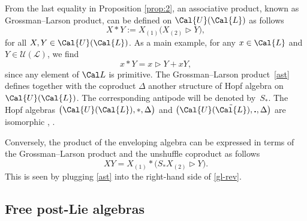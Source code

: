 \documentclass[10pt,a4paper]{amsart}
\numberwithin{equation}{section}
\begin{document}
From the last equality in Proposition \ref{prop:2}, an associative product, known as Grossman--Larson product, can be defined on $\Cal{U}(\Cal{L})$ as follows
\begin{equation}\label{ast}
X \ast Y := X_{(1)}\big(X_{(2)} \rhd Y\big),
\end{equation}
for all $X, Y \in \Cal{U}(\Cal{L})$. As a main example, for any $x\in \Cal{L}$ and $Y\in\mathcal U(\mathcal L)$, we find
\begin{equation}\label{GL-simple}
x \ast Y = x \rhd Y + xY,
\end{equation}
since any element of $\Cal L$ is primitive. The Grossman--Larson product~\eqref{ast} defines together with the coproduct $\Delta$ another structure of Hopf algebra on $\Cal{U}(\Cal{L})$. The corresponding antipode will be denoted by~$S_*$. The Hopf algebras $\big(\Cal{U}(\Cal{L}), \ast, \Delta \big)$ and $\big(\Cal{U}(\tilde{\Cal{L}}), \textbf{.}, \Delta \big)$ are isomorphic \cite[Section~3]{KLM06}, \cite[Section~2]{OG2008}.
\begin{Remark}
Conversely, the product of the enveloping algebra can be expressed in terms of the Grossman--Larson product and the unshuffle coproduct as follows
\begin{equation}\label{gl-rev}
XY=X_{(1)}*\big(S_*X_{(2)}\rhd Y\big).
\end{equation}
This is seen by plugging \eqref{ast} into the right-hand side of \eqref{gl-rev}.
\end{Remark}

\subsection{Free post-Lie algebras}
\end{document}
